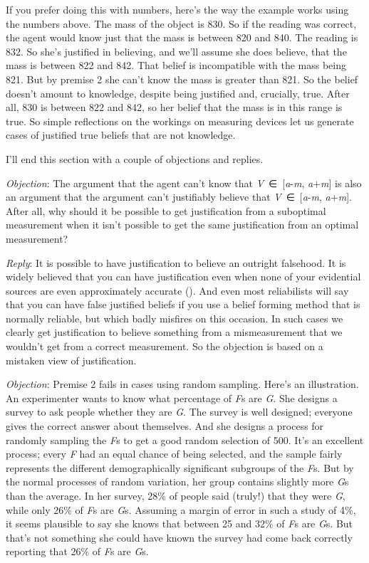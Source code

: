 \documentclass[
  10pt,
  letterpaper,
  DIV=11,
  numbers=noendperiod,
  twoside]{scrartcl}
\begin{document}
If you prefer doing this with numbers, here's the way the example works
using the numbers above. The mass of the object is 830. So if the
reading was correct, the agent would know just that the mass is between
820 and 840. The reading is 832. So she's justified in believing, and
we'll assume she does believe, that the mass is between 822 and 842.
That belief is incompatible with the mass being 821. But by premise 2
she can't know the mass is greater than 821. So the belief doesn't
amount to knowledge, despite being justified and, crucially, true. After
all, 830 is between 822 and 842, so her belief that the mass is in this
range is true. So simple reflections on the workings on measuring
devices let us generate cases of justified true beliefs that are not
knowledge.

I'll end this section with a couple of objections and replies.

\emph{Objection}: The argument that the agent can't know that
\emph{V}~∈~{[}\emph{a}-\emph{m}, \emph{a}+\emph{m}{]} is also an
argument that the argument can't justifiably believe that
\emph{V}~∈~{[}\emph{a}-\emph{m}, \emph{a}+\emph{m}{]}. After all, why
should it be possible to get justification from a suboptimal measurement
when it isn't possible to get the same justification from an optimal
measurement?

\emph{Reply}: It is possible to have justification to believe an
outright falsehood. It is widely believed that you can have
justification even when none of your evidential sources are even
approximately accurate (). And even
most reliabilists will say that you can have false justified beliefs if
you use a belief forming method that is normally reliable, but which
badly misfires on this occasion. In such cases we clearly get
justification to believe something from a mismeasurement that we
wouldn't get from a correct measurement. So the objection is based on a
mistaken view of justification.

\emph{Objection}: Premise 2 fails in cases using random sampling. Here's
an illustration. An experimenter wants to know what percentage of
\emph{F}s are \emph{G}. She designs a survey to ask people whether they
are \emph{G}. The survey is well designed; everyone gives the correct
answer about themselves. And she designs a process for randomly sampling
the \emph{F}s to get a good random selection of 500. It's an excellent
process; every \emph{F} had an equal chance of being selected, and the
sample fairly represents the different demographically significant
subgroups of the \emph{F}s. But by the normal processes of random
variation, her group contains slightly more \emph{G}s than the average.
In her survey, 28\% of people said (truly!) that they were \emph{G},
while only 26\% of \emph{F}s are \emph{G}s. Assuming a margin of error
in such a study of 4\%, it seems plausible to say she knows that between
25 and 32\% of \emph{F}s are \emph{G}s. But that's not something she
could have known the survey had come back correctly reporting that 26\%
of \emph{F}s are \emph{G}s.
\end{document}
